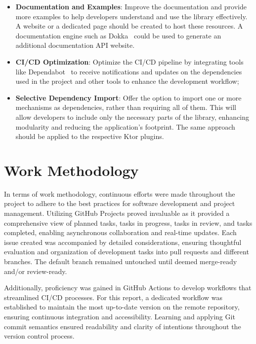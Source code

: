 \begin{itemize}
    \item \textbf{Documentation and Examples}:
    Improve the documentation
    and provide more examples to help developers understand and use the library effectively.
    A website or a dedicated page should be created
    to host these resources.
    A documentation engine such as Dokka~\cite{dokka} could be used to generate an additional documentation API website.
    \item \textbf{CI/CD Optimization}:
    Optimize the CI/CD pipeline by integrating tools like Dependabot~\cite{github-dependabot} to receive notifications and updates on the dependencies used in the project and other tools to enhance the development workflow;
    \item \textbf{Selective Dependency Import}:
    Offer the option to import one or more mechanisms as dependencies, rather than requiring all of them.
    This will allow developers to include only the necessary parts of the library, enhancing modularity and reducing the application's footprint.
    The same approach should be applied to the respective Ktor plugins.
\end{itemize}


\section{Work Methodology}\label{sec:work-methodology}

In terms of work methodology, continuous efforts were made throughout the project to adhere to the best practices for software development and project management.
Utilizing GitHub Projects proved invaluable as it provided a comprehensive view of planned tasks,
tasks in progress, tasks in review, and tasks completed, enabling asynchronous collaboration and real-time updates.
Each issue created was accompanied by detailed considerations,
ensuring thoughtful evaluation and organization of development tasks into pull requests and different branches.
The default branch remained untouched until deemed merge-ready and/or review-ready.

Additionally, proficiency was gained in GitHub Actions to develop workflows that streamlined CI/CD processes.
For this report, a dedicated workflow was established to maintain the most up-to-date version on the remote repository,
ensuring continuous integration and accessibility.
Learning and applying Git commit semantics ensured readability and clarity of intentions throughout the version control process.
